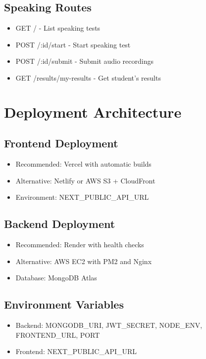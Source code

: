 \documentclass{article}
\begin{document}
\subsection{Speaking Routes}
\begin{itemize}
    \item GET / - List speaking tests
    \item POST /:id/start - Start speaking test
    \item POST /:id/submit - Submit audio recordings
    \item GET /results/my-results - Get student's results
\end{itemize}

\section{Deployment Architecture}

\subsection{Frontend Deployment}
\begin{itemize}
    \item Recommended: Vercel with automatic builds
    \item Alternative: Netlify or AWS S3 + CloudFront
    \item Environment: NEXT\_PUBLIC\_API\_URL
\end{itemize}

\subsection{Backend Deployment}
\begin{itemize}
    \item Recommended: Render with health checks
    \item Alternative: AWS EC2 with PM2 and Nginx
    \item Database: MongoDB Atlas
\end{itemize}

\subsection{Environment Variables}
\begin{itemize}
    \item Backend: MONGODB\_URI, JWT\_SECRET, NODE\_ENV, FRONTEND\_URL, PORT
    \item Frontend: NEXT\_PUBLIC\_API\_URL
\end{itemize}
\end{document}
